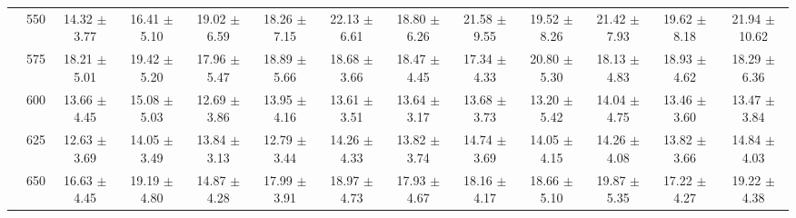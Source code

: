 \begin{table}[h]
{\begin{tabular}{
        ccccccccccccc}
 & 550& 14.32 $\pm$ 3.77& 16.41 $\pm$ 5.10& 19.02 $\pm$ 6.59& 18.26 $\pm$ 7.15& 22.13 $\pm$ 6.61& 18.80 $\pm$ 6.26& 21.58 $\pm$ 9.55& 19.52 $\pm$ 8.26& 21.42 $\pm$ 7.93& 19.62 $\pm$ 8.18& 21.94 $\pm$ 10.62 \\ 
 & 575& 18.21 $\pm$ 5.01& 19.42 $\pm$ 5.20& 17.96 $\pm$ 5.47& 18.89 $\pm$ 5.66& 18.68 $\pm$ 3.66& 18.47 $\pm$ 4.45& 17.34 $\pm$ 4.33& 20.80 $\pm$ 5.30& 18.13 $\pm$ 4.83& 18.93 $\pm$ 4.62& 18.29 $\pm$ 6.36 \\ 
 & 600& 13.66 $\pm$ 4.45& 15.08 $\pm$ 5.03& 12.69 $\pm$ 3.86& 13.95 $\pm$ 4.16& 13.61 $\pm$ 3.51& 13.64 $\pm$ 3.17& 13.68 $\pm$ 3.73& 13.20 $\pm$ 5.42& 14.04 $\pm$ 4.75& 13.46 $\pm$ 3.60& 13.47 $\pm$ 3.84 \\ 
 & 625& 12.63 $\pm$ 3.69& 14.05 $\pm$ 3.49& 13.84 $\pm$ 3.13& 12.79 $\pm$ 3.44& 14.26 $\pm$ 4.33& 13.82 $\pm$ 3.74& 14.74 $\pm$ 3.69& 14.05 $\pm$ 4.15& 14.26 $\pm$ 4.08& 13.82 $\pm$ 3.66& 14.84 $\pm$ 4.03 \\ 
 & 650& 16.63 $\pm$ 4.45& 19.19 $\pm$ 4.80& 14.87 $\pm$ 4.28& 17.99 $\pm$ 3.91& 18.97 $\pm$ 4.73& 17.93 $\pm$ 4.67& 18.16 $\pm$ 4.17& 18.66 $\pm$ 5.10& 19.87 $\pm$ 5.35& 17.22 $\pm$ 4.27& 19.22 $\pm$ 4.38 \\ \hline 

        \end{tabular}%
        }

        \end{table}
        
